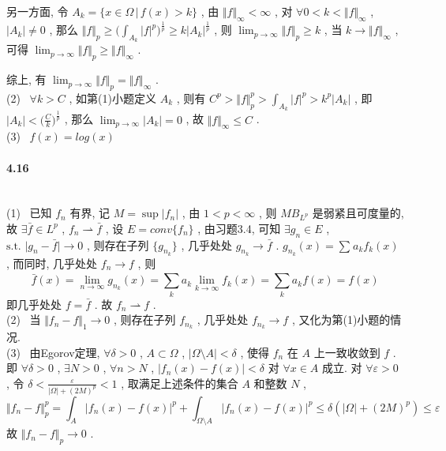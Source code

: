 \documentclass[a4paper, UTF8]{ctexart}				%
\numberwithin{equation}{section}				%
\begin{document}
	另一方面, 令 $A_k = \{x \in \Omega \,\big|\, f(x) > k \}$ ,
	由 $\Vert{f}\Vert_\infty < \infty$ ,
	对 $\forall 0 < k < \Vert{f}\Vert_\infty$ ,
	$\vert{A_k}\vert \neq 0$ ,
	那么 $\Vert{f}\Vert_p \ge \Big( \int^{ }_{A_k} \vert{f}\vert^p \Big)^{\frac{1}{p}} \ge k \vert{A_k}\vert^{\frac{1}{p}}$ ,
	则 $\lim_{p \rightarrow \infty} \Vert{f}\Vert_p \ge k$ ,
	当 $k \rightarrow \Vert{f}\Vert_\infty$ ,
	可得 $\lim_{p \rightarrow \infty} \Vert{f}\Vert_p \ge \Vert{f}\Vert_\infty$ .

	综上, 有 $\lim_{p \rightarrow \infty} \Vert{f}\Vert_p = \Vert{f}\Vert_\infty$ .\\

	\noindent(2) \, $\forall k > C$ , 如第(1)小题定义 $A_k$ ,
	则有 $C^p > \Vert{f}\Vert^p_p > \int^{ }_{A_k} \vert{f}\vert^p > k^p \vert{A_k}\vert$ ,
	即 $\vert{A_k}\vert < \big( \frac{C}{k} \big)^{\frac{1}{p}}$ ,
	那么 $\lim_{p \rightarrow \infty} \vert{A_k}\vert = 0$ ,
	故 $\Vert{f}\Vert_\infty \le C$ .\\

	\noindent(3) \, $f(x) = log(x)$\\

	\paragraph{4.16}\quad\\
	\noindent(1) \, 已知 $f_n$ 有界, 记 $M = \sup \vert{f_n}\vert$ ,
	由 $1 < p < \infty$ , 则 $M B_{L^p}$ 是弱紧且可度量的,
	故 $\exists \bar{f} \in L^p$ , $f_n \rightharpoonup \bar{f}$ ,
	设 $E = conv\{f_n\}$ , 由习题3.4, 可知 $\exists g_n \in E$ , $\text{s.t. } \vert g_n - \bar{f} \vert \rightarrow 0$ ,
	则存在子列 $\{g_{n_k}\}$ , 几乎处处 $g_{n_k} \rightarrow \bar{f}$ .
	$g_{n_k}(x) = \sum^{ }_{ }a_k f_k(x)$ ,
	而同时, 几乎处处 $f_n \rightarrow f$ ,
	则 
	\[
		\bar{f}(x) = \lim_{n \rightarrow \infty} g_{n_k}(x) = \sum^{ }_{k} a_k \lim_{k \rightarrow \infty} f_k(x) = \sum^{}_{k} a_k f(x) = f(x)
	\]
	即几乎处处 $f = \bar{f}$ . 故 $f_n \rightharpoonup f$ .\\

	\noindent(2) \, 当 $\Vert{f_n - f}\Vert_1 \rightarrow 0$ ,
	则存在子列 $f_{n_k}$ ,
	几乎处处 $f_{n_k} \rightarrow f$ , 又化为第(1)小题的情况.\\

	\noindent(3) \, 由Egorov定理, $\forall \delta > 0$ ,
	$A \subset \Omega$ ,
	$\vert{\Omega \setminus A}\vert < \delta$ ,
	使得 $f_n$ 在 $A$ 上一致收敛到 $f$ .
	即 $\forall \delta > 0$ ,
	$\exists N > 0$ , $\forall n > N$ ,
	$\vert{f_n(x) - f(x)}\vert < \delta$ 对 $\forall x \in A$ 成立.
	对 $\forall \varepsilon > 0$ , 令 $\delta < \frac{\varepsilon}{\vert{\Omega}\vert + (2M)^p} < 1$ , 取满足上述条件的集合 $A$ 和整数 $N$ , 
	\[
		\Vert{f_n - f}\Vert_p^p = \int^{ }_{A} \vert{f_n(x) - f(x)}\vert^p + \int^{ }_{\Omega \setminus A} \vert{f_n(x) - f(x)}\vert^p \le \delta(\vert{\Omega}\vert + (2M)^p) \le \varepsilon
	\]
	故 $\Vert{f_n - f}\Vert_p \rightarrow 0$ .\\
\end{document}
